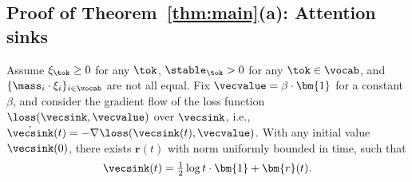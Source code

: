 \subsection{Proof of Theorem~\ref{thm:main}(a): Attention sinks}\label{appsec:proof-main-1}
\begin{theorem}\label{appthm:main-2}
Assume $\xi_\tok \ge 0$ for any $\tok$, $\stable_\tok > 0$ for any $\tok\in\vocab$, and $\{ \mass_i \cdot \xi_i \}_{i \in \vocab}$ are not all equal. Fix $\vecvalue= \beta \cdot \bm{1}$ for a constant $\beta$, and consider the gradient flow of the loss function $\loss(\vecsink, \vecvalue)$ over $\vecsink$, i.e., $\dot{\vecsink}(t) = - \nabla \loss(\vecsink(t), \vecvalue)$. With any initial value $\vecsink(0)$, there exists $\bm{r}(t)$ with norm uniformly bounded in time, such that 
    \begin{equation}
    \textstyle \vecsink(t) = \frac{1}{2} \log t \cdot \bm{1} + \bm{r}(t).
    \end{equation}
\end{theorem}
